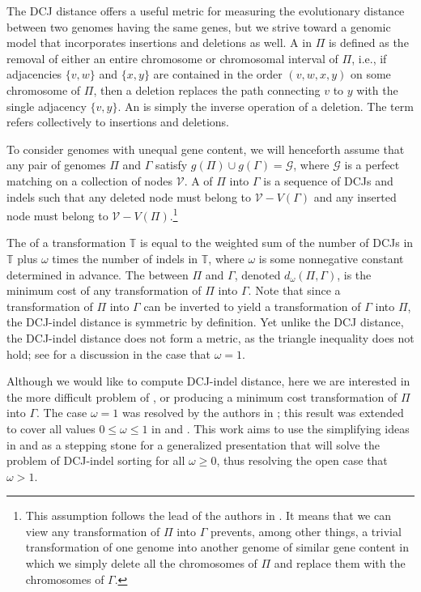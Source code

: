 The DCJ distance offers a useful metric for measuring the evolutionary distance between two genomes having the same genes, but we strive toward a genomic model that incorporates insertions and deletions as well.  A  in $\Pi$ is defined as the removal of either an entire chromosome or chromosomal interval of $\Pi$, i.e., if adjacencies $\{v, w\}$ and $\{x, y\}$ are contained in the order $(v, w, x, y)$ on some chromosome of $\Pi$, then a deletion replaces the path connecting $v$ to $y$ with the single adjacency $\{v, y\}$.  An  is simply the inverse operation of a deletion.  The term  refers collectively to insertions and deletions.

To consider genomes with unequal gene content, we will henceforth assume that any pair of genomes $\Pi$ and $\Gamma$ satisfy $g(\Pi) \cup g(\Gamma) = \mathcal{G}$, where $\mathcal{G}$ is a perfect matching on a collection of nodes $\mathcal{V}$.   A  of $\Pi$ into $\Gamma$ is a sequence of DCJs and indels such that any deleted node must belong to $\mathcal{V} - V(\Gamma)$ and any inserted node must belong to $\mathcal{V} - V(\Pi)$.\footnote{This assumption follows the lead of the authors in \cite{braga2010}. It means that we can view any transformation of $\Pi$ into $\Gamma$  prevents, among other things, a trivial transformation of one genome into another genome of similar gene content in which we simply delete all the chromosomes of $\Pi$ and replace them with the chromosomes of $\Gamma$.}

The  of a transformation $\mathbb{T}$ is equal to the weighted sum of the number of DCJs in $\mathbb{T}$ plus $\omega$ times the number of indels in $\mathbb{T}$, where $\omega$ is some nonnegative constant determined in advance.  The  between $\Pi$ and $\Gamma$, denoted $d_{\omega}(\Pi, \Gamma)$, is the minimum cost of any transformation of $\Pi$ into $\Gamma$.  Note that since a transformation of $\Pi$ into $\Gamma$ can be inverted to yield a transformation of $\Gamma$ into $\Pi$, the DCJ-indel distance is symmetric by definition.  Yet unlike the DCJ distance, the DCJ-indel distance does not form a metric, as the triangle inequality does not hold; see \cite{stoye_triangle} for a discussion in the case that $\omega = 1$.

Although we would like to compute DCJ-indel distance, here we are interested in the more difficult problem of , or producing a minimum cost transformation of $\Pi$ into $\Gamma$.  The case $\omega = 1$ was resolved by the authors in \cite{braga2010}; this result was extended to cover all values $0 \leq \omega \leq 1$ in \cite{braga2012} and \cite{braga2013}.  This work aims to use the simplifying ideas in \cite{compeau2012} and \cite{compeau2013} as a stepping stone for a generalized presentation that will solve the problem of DCJ-indel sorting for all $\omega \geq 0$, thus resolving the open case that $\omega > 1$.

